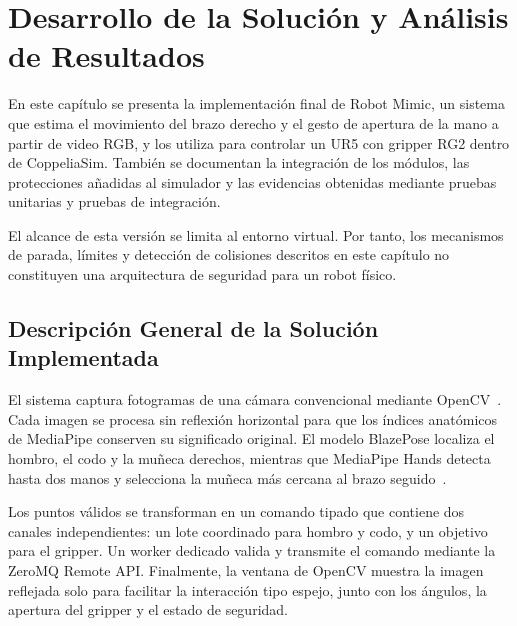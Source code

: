 
\chapter{Desarrollo de la Solución y Análisis de Resultados}
\label{chap:desarrollo_resultados}

En este capítulo se presenta la implementación final de Robot Mimic, un sistema
que estima el movimiento del brazo derecho y el gesto de apertura de la mano a
partir de video RGB, y los utiliza para controlar un UR5 con gripper RG2 dentro
de CoppeliaSim. También se documentan la integración de los módulos, las
protecciones añadidas al simulador y las evidencias obtenidas mediante pruebas
unitarias y pruebas de integración.

El alcance de esta versión se limita al entorno virtual. Por tanto, los
mecanismos de parada, límites y detección de colisiones descritos en este
capítulo no constituyen una arquitectura de seguridad para un robot físico.

\section{Descripción General de la Solución Implementada}
\label{sec:descripcion_solucion}

El sistema captura fotogramas de una cámara convencional mediante
OpenCV~\cite{Bradski2000}. Cada imagen se procesa sin reflexión horizontal para
que los índices anatómicos de MediaPipe conserven su significado original. El
modelo BlazePose localiza el hombro, el codo y la muñeca derechos, mientras que
MediaPipe Hands detecta hasta dos manos y selecciona la muñeca más cercana al
brazo seguido~\cite{Bazarevskyetal2020,Lugaresietal2019}.

Los puntos válidos se transforman en un comando tipado que contiene dos canales
independientes: un lote coordinado para hombro y codo, y un objetivo para el
gripper. Un worker dedicado valida y transmite el comando mediante la ZeroMQ
Remote API. Finalmente, la ventana de OpenCV muestra la imagen reflejada solo
para facilitar la interacción tipo espejo, junto con los ángulos, la apertura
del gripper y el estado de seguridad.


